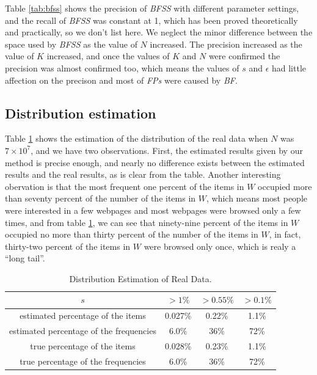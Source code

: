 \documentclass[conference]{IEEEtran}
\begin{document}
Table \ref{tab:bfss} shows the precision of \emph{BFSS} with different parameter settings, and the recall of \emph{BFSS} was constant at 1, which has been proved theoretically and practically, so we don't list here. We neglect the minor difference between the space used by \emph{BFSS} as the value of $N$ increased. The precision increased as the value of $K$ increased, and once the values of $K$ and $N$ were confirmed the precision was almost confirmed too, which means the values of $s$ and $\epsilon$ had little affection on the precison and most of \emph{FPs} were caused by \emph{BF}.
\subsection{Distribution estimation}
Table \ref{tab:distribution} shows the estimation of the distribution of the real data when $N$ was $7\times10^7$, and we have two observations. First, the estimated results given by our method is precise enough, and nearly no difference exists between the estimated results and the real results, as is clear from the table. Another interesting obervation is that the most frequent one percent of the items in $W$ occupied more than seventy percent of the number of the items in $W$, which means most people were interested in a few webpages and most webpages were browsed only a few times, and from table \ref{tab:distribution}, we can see that ninety-nine percent of the items in $W$ occupied no more than thirty percent of the number of the items in $W$, in fact, thirty-two percent of the items in $W$ were browsed only once, which is realy a ``long tail''.

\begin{table}
	\caption{Distribution Estimation of Real Data.}
	\centering
	\begin{tabular}{|c|c|c|c|}
    \hline
    $s$&$>1\%$&$>0.55\%$&$>0.1\%$\\
    \hline
    estimated percentage of the items&0.027\%&0.22\%&1.1\%\\
    \hline
    estimated percentage of the frequencies&6.0\%&36\%&72\%\\
    \hline
    true percentage of the items&0.028\%&0.23\%&1.1\%\\
    \hline
    true percentage of the frequencies&6.0\%&36\%&72\%\\
    \hline
	\end{tabular}
	\label{tab:distribution}
\end{table}
\end{document}

